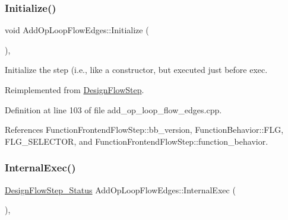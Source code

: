 \mbox{\label{classAddOpLoopFlowEdges_a6fb9be353ace7d554c91a4056f102855}} 
\subsubsection{\texorpdfstring{Initialize()}{Initialize()}}
{\footnotesize\ttfamily void Add\+Op\+Loop\+Flow\+Edges\+::\+Initialize (\begin{DoxyParamCaption}{ }\end{DoxyParamCaption})\hspace{0.3cm}{\ttfamily [override]}, {\ttfamily [virtual]}}



Initialize the step (i.\+e., like a constructor, but executed just before exec. 



Reimplemented from \hyperlink{classDesignFlowStep_a44b50683382a094976e1d432a7784799}{Design\+Flow\+Step}.



Definition at line 103 of file add\+\_\+op\+\_\+loop\+\_\+flow\+\_\+edges.\+cpp.



References Function\+Frontend\+Flow\+Step\+::bb\+\_\+version, Function\+Behavior\+::\+F\+LG, F\+L\+G\+\_\+\+S\+E\+L\+E\+C\+T\+OR, and Function\+Frontend\+Flow\+Step\+::function\+\_\+behavior.

\mbox{\label{classAddOpLoopFlowEdges_ac2f9ac00b5800bea8a2167e12f7c9474}} 
\subsubsection{\texorpdfstring{Internal\+Exec()}{InternalExec()}}
{\footnotesize\ttfamily \hyperlink{design__flow__step_8hpp_afb1f0d73069c26076b8d31dbc8ebecdf}{Design\+Flow\+Step\+\_\+\+Status} Add\+Op\+Loop\+Flow\+Edges\+::\+Internal\+Exec (\begin{DoxyParamCaption}{ }\end{DoxyParamCaption})\hspace{0.3cm}{\ttfamily [override]}, {\ttfamily [virtual]}}




